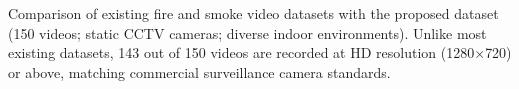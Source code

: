 \begin{table}[htbp]
    \caption{Comparison of existing fire and smoke video datasets with the proposed dataset (150 videos; static CCTV cameras; diverse indoor environments). Unlike most existing datasets, 143 out of 150 videos are recorded at HD resolution (1280$\times$720) or above, matching commercial surveillance camera standards.}
    \label{tb:ufireindoor}
\end{table}

